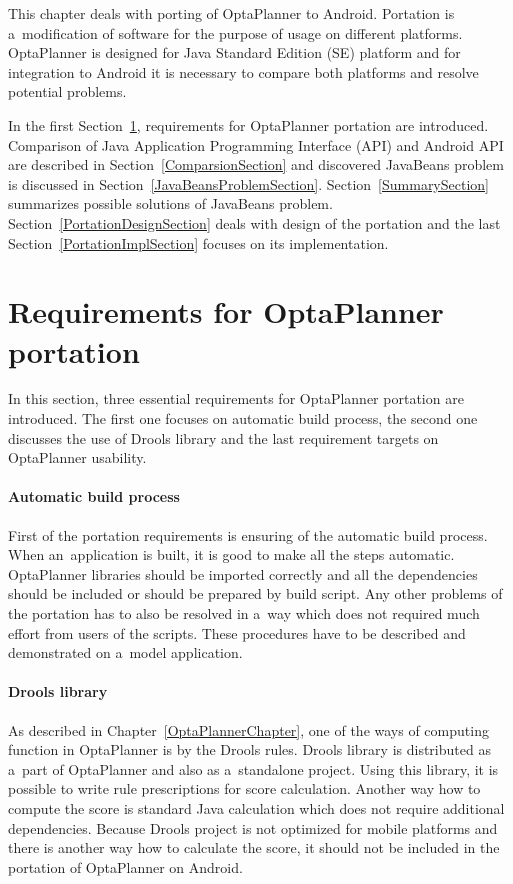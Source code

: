 This chapter deals with porting of OptaPlanner to Android. Portation is a~modification of software for the purpose of
usage on different platforms. OptaPlanner is designed for Java Standard Edition (SE) platform and for integration to
Android it is necessary to compare both platforms and resolve potential problems.

In the first Section~\ref{RequirementsPortationSection}, requirements for OptaPlanner portation are introduced.
Comparison of Java Application Programming Interface (API) and Android API are described in
Section~\ref{ComparsionSection} and discovered JavaBeans problem is discussed in Section~\ref{JavaBeansProblemSection}.
Section~\ref{SummarySection} summarizes possible solutions of JavaBeans problem. Section~\ref{PortationDesignSection}
deals with design of the portation and the last Section~\ref{PortationImplSection} focuses on its implementation.

\section{Requirements for OptaPlanner portation}\label{RequirementsPortationSection}
In this section, three essential requirements for OptaPlanner portation are introduced. The first one focuses on
automatic build process, the second one discusses the use of Drools library and the last requirement targets on
OptaPlanner usability.

\paragraph{Automatic build process}
First of the portation requirements is ensuring of the automatic build process. When an~application is built, it is
good to make all the steps automatic. OptaPlanner libraries should be imported correctly and all the dependencies should
be included or should be prepared by build script. Any other problems of the portation has to also be resolved in a~way
which does not required much effort from users of the scripts. These procedures have to be described and demonstrated on
a~model application.

\paragraph{Drools library}
As described in Chapter~\ref{OptaPlannerChapter}, one of the ways of computing function in OptaPlanner is by the Drools
rules. Drools library is distributed as a~part of OptaPlanner and also as a~standalone project. Using this library, it
is possible to write rule prescriptions for score calculation. Another way how to compute the score is standard Java
calculation which does not require additional dependencies. Because Drools project is not optimized for mobile platforms
and there is another way how to calculate the score, it should not be included in the portation of OptaPlanner on
Android.

